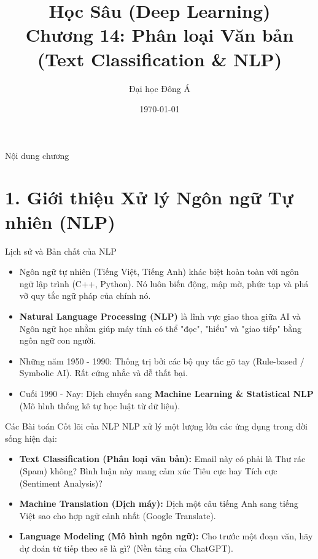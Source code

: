 \documentclass[aspectratio=169]{beamer}
\title[Chương 14: Phân loại Văn bản]{Học Sâu (Deep Learning) \\ \vspace{0.5cm} \Large Chương 14: Phân loại Văn bản \\ (Text Classification \& NLP)}
\author{Đại học Đông Á}
\date{\today}
\begin{document}
\begin{frame}
    \titlepage
\end{frame}

\begin{frame}{Nội dung chương}
    \tableofcontents
\end{frame}

\section{1. Giới thiệu Xử lý Ngôn ngữ Tự nhiên (NLP)}

\begin{frame}{Lịch sử và Bản chất của NLP}
    \begin{itemize}
        \item Ngôn ngữ tự nhiên (Tiếng Việt, Tiếng Anh) khác biệt hoàn toàn với ngôn ngữ lập trình (C++, Python). Nó luôn biến động, mập mờ, phức tạp và phá vỡ quy tắc ngữ pháp của chính nó.
        \item \textbf{Natural Language Processing (NLP)} là lĩnh vực giao thoa giữa AI và Ngôn ngữ học nhằm giúp máy tính có thể "đọc", "hiểu" và "giao tiếp" bằng ngôn ngữ con người.
        \item Những năm 1950 - 1990: Thống trị bởi các bộ quy tắc gõ tay (Rule-based / Symbolic AI). Rất cứng nhắc và dễ thất bại.
        \item Cuối 1990 - Nay: Dịch chuyển sang \textbf{Machine Learning \& Statistical NLP} (Mô hình thống kê tự học luật từ dữ liệu).
    \end{itemize}
\end{frame}

\begin{frame}{Các Bài toán Cốt lõi của NLP}
    NLP xử lý một lượng lớn các ứng dụng trong đời sống hiện đại:
    \begin{itemize}
        \item \textbf{Text Classification (Phân loại văn bản):} Email này có phải là Thư rác (Spam) không? Bình luận này mang cảm xúc Tiêu cực hay Tích cực (Sentiment Analysis)?
        \item \textbf{Machine Translation (Dịch máy):} Dịch một câu tiếng Anh sang tiếng Việt sao cho hợp ngữ cảnh nhất (Google Translate).
        \item \textbf{Language Modeling (Mô hình ngôn ngữ):} Cho trước một đoạn văn, hãy dự đoán từ tiếp theo sẽ là gì? (Nền tảng của ChatGPT).
    \end{itemize}
\end{frame}
\end{document}

